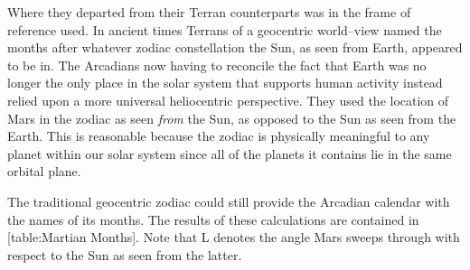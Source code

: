 Where they departed from their Terran counterparts was in the frame of reference used. In ancient times Terrans of a geocentric world--view named the months after whatever zodiac constellation the Sun, as seen from Earth, appeared to be in. The Arcadians now having to reconcile the fact that Earth was no longer the only place in the solar system that supports human activity instead relied upon a more universal heliocentric perspective. They used the location of Mars in the zodiac as seen {\it from} the Sun, as opposed to the Sun as seen from the Earth. This is reasonable because the zodiac is physically meaningful to any planet within our solar system since all of the planets it contains lie in the same orbital plane. 

The traditional geocentric zodiac could still provide the Arcadian calendar with the names of its months. The results of these calculations are contained in [table:Martian Months]. Note that L denotes the angle Mars sweeps through with respect to the Sun as seen from the latter.

